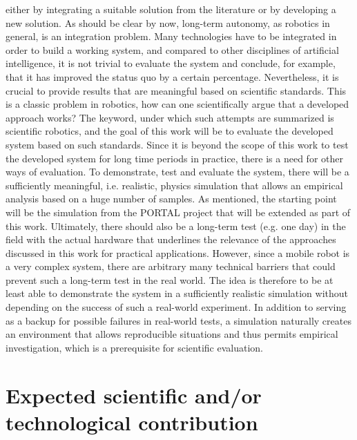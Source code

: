 \documentclass[english, master, expose, utf8]{base/thesis_KBS}
\begin{document}
either by integrating a suitable solution from the literature or by developing a new solution.\newline
As should be clear by now, long-term autonomy, as robotics in general, is an integration problem. Many technologies have to be integrated in order to build a working system, 
and compared to other disciplines of artificial intelligence, it is not trivial to evaluate the system and conclude, for example, that it has improved the status quo by a 
certain percentage. Nevertheless, it is crucial to provide results that are meaningful based on scientific standards. This is a classic problem in robotics, 
how can one scientifically argue that a developed approach works? The keyword, under which such attempts are summarized is scientific robotics, 
and the goal of this work will be to evaluate the developed system based on such standards.
Since it is beyond the scope of this work to test the developed system for long time periods in practice, there is a need for other ways of evaluation.
To demonstrate, test and evaluate the system, there will be a sufficiently meaningful, i.e. realistic, physics simulation that allows an empirical analysis based 
on a huge number of samples. As mentioned, the starting point will be the simulation from the PORTAL project that will be extended as part of this work.
Ultimately, there should also be a long-term test (e.g. one day) in the field with the actual hardware that underlines the relevance of 
the approaches discussed in this work for practical applications. However, since a mobile robot is a very complex system, there are arbitrary many technical barriers 
that could prevent such a long-term test in the real world. The idea is therefore to be at least able to demonstrate the system in a sufficiently realistic simulation 
without depending on the success of such a real-world experiment. In addition to serving as a backup for possible failures in real-world tests, a simulation naturally 
creates an environment that allows reproducible situations and thus permits empirical investigation, which is a prerequisite for scientific evaluation.

\section{Expected scientific and/or technological contribution}
\end{document}
